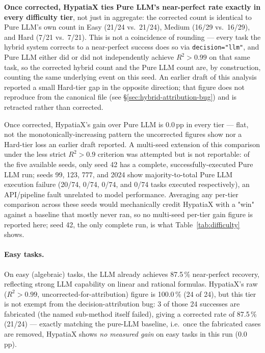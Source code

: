 \documentclass[twoside,11pt]{article}
\newcommand{\Rsq}{R^{2}}
\begin{document}
\textbf{Once corrected, HypatiaX ties Pure LLM's near-perfect rate exactly in
every difficulty tier}, not just in aggregate: the corrected count is
identical to Pure LLM's own count in Easy (21/24 vs.\ 21/24), Medium (16/29
vs.\ 16/29), and Hard (7/21 vs.\ 7/21). This is not a coincidence of
rounding --- every task the hybrid system corrects to a near-perfect success
does so via \texttt{decision="llm"}, and Pure LLM either did or did not
independently achieve $\Rsq>0.99$ on that same task, so the corrected hybrid
count and the Pure LLM count are, by construction, counting the same
underlying event on this seed. An earlier draft of this analysis reported a
small Hard-tier gap in the opposite direction; that figure does not
reproduce from the canonical file (see \S\ref{sec:hybrid-attribution-bug})
and is retracted rather than corrected.

Once corrected, HypatiaX's gain over Pure LLM is $0.0$\,pp in every tier ---
flat, not the monotonically-increasing pattern the uncorrected figures show
nor a Hard-tier loss an earlier draft reported. A multi-seed extension of
this comparison under the less strict $\Rsq>0.9$ criterion was attempted but
is not reportable: of the five available seeds, only seed 42 has a complete,
successfully-executed Pure LLM run; seeds 99, 123, 777, and 2024 show
majority-to-total Pure LLM execution failure (20/74, 0/74, 0/74, and 0/74
tasks executed respectively), an API/pipeline fault unrelated to model
performance. Averaging any per-tier comparison across these seeds would
mechanically credit HypatiaX with a "win" against a baseline that mostly
never ran, so no multi-seed per-tier gain figure is reported here; seed 42,
the only complete run, is what Table~\ref{tab:difficulty} shows.

\paragraph{Easy tasks.}
On easy (algebraic) tasks, the LLM already achieves 87.5\,\% near-perfect recovery,
reflecting strong LLM capability on linear and rational formulas. HypatiaX's
raw ($\Rsq>0.99$, uncorrected-for-attribution) figure is 100.0\,\% (24 of 24),
but this tier is not exempt from the decision-attribution bug: 3 of those 24
successes are fabricated (the named sub-method itself failed), giving a
corrected rate of 87.5\,\% (21/24) --- exactly matching
the pure-LLM baseline, i.e.\ once the fabricated cases are removed, HypatiaX shows
\emph{no measured gain} on easy tasks in this run ($0.0$\,pp).
\end{document}
